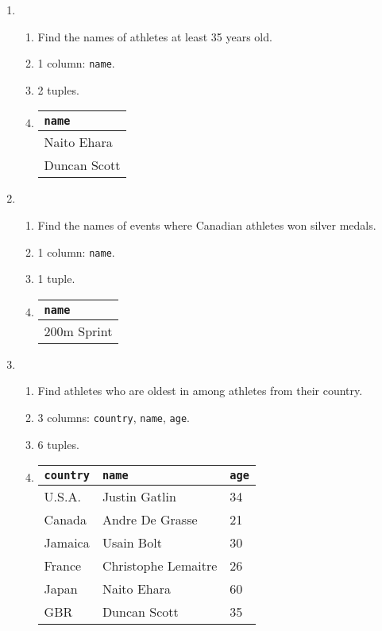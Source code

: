 \documentclass{article}
\begin{document}
\begin{enumerate}
    \item
    \begin{enumerate}
        \item Find the names of athletes at least 35 years old.
        \item 1 column: \texttt{name}.
        \item 2 tuples.
        \item 
        \begin{tabular}{@{}l@{}}
            \toprule
            \texttt{name} \\ \midrule
            Naito Ehara   \\
            Duncan Scott  \\ \bottomrule
        \end{tabular}
    \end{enumerate}

    \item
    \begin{enumerate}
        \item Find the names of events where Canadian athletes won silver medals.
        \item 1 column: \texttt{name}.
        \item 1 tuple.
        \item
        \begin{tabular}{@{}l@{}}
            \toprule
            \texttt{name} \\ \midrule
            200m Sprint   \\ \bottomrule
        \end{tabular}
    \end{enumerate}

    \item
    \begin{enumerate}
        \item Find athletes who are oldest in among athletes from their country.
        \item 3 columns: \texttt{country}, \texttt{name}, \texttt{age}.
        \item 6 tuples.
        \item
        \begin{tabular}{@{}lll@{}}
            \toprule
            \texttt{country} & \texttt{name}       & \texttt{age} \\ \midrule
            U.S.A.           & Justin Gatlin       & 34           \\
            Canada           & Andre De Grasse     & 21           \\
            Jamaica          & Usain Bolt          & 30           \\
            France           & Christophe Lemaitre & 26           \\
            Japan            & Naito Ehara         & 60           \\
            GBR              & Duncan Scott        & 35           \\ \bottomrule
        \end{tabular}
    \end{enumerate}
\end{enumerate}
\end{document}
